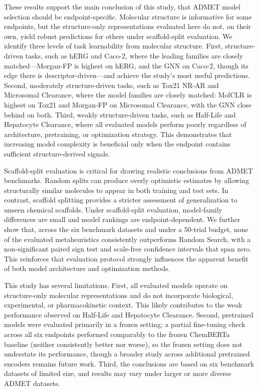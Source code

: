 \documentclass[journal]{IEEEtran}
\begin{document}
These results support the main conclusion of this study, that ADMET model selection should be endpoint-specific. Molecular structure is informative for some endpoints, but the structure-only representations evaluated here do not, on their own, yield robust predictions for others under scaffold-split evaluation. We identify three levels of task learnability from molecular structure. First, structure-driven tasks, such as hERG and Caco-2, where the leading families are closely matched---Morgan-FP is highest on hERG, and the GNN on Caco-2, though its edge there is descriptor-driven---and achieve the study's most useful predictions. Second, moderately structure-driven tasks, such as Tox21 NR-AR and Microsomal Clearance, where the model families are closely matched: MolCLR is highest on Tox21 and Morgan-FP on Microsomal Clearance, with the GNN close behind on both. Third, weakly structure-driven tasks, such as Half-Life and Hepatocyte Clearance, where all evaluated models perform poorly regardless of architecture, pretraining, or optimization strategy. This demonstrates that increasing model complexity is beneficial only when the endpoint contains sufficient structure-derived signals.

Scaffold-split evaluation is critical for drawing realistic conclusions from ADMET benchmarks. Random splits can produce overly optimistic estimates by allowing structurally similar molecules to appear in both training and test sets. In contrast, scaffold splitting provides a stricter assessment of generalization to unseen chemical scaffolds. Under scaffold-split evaluation, model-family differences are small and model rankings are endpoint-dependent. We further show that, across the six benchmark datasets and under a 50-trial budget, none of the evaluated metaheuristics consistently outperforms Random Search, with a non-significant paired sign test and scale-free confidence intervals that span zero. This reinforces that evaluation protocol strongly influences the apparent benefit of both model architecture and optimization methods.

This study has several limitations. First, all evaluated models operate on structure-only molecular representations and do not incorporate biological, experimental, or pharmacokinetic context. This likely contributes to the weak performance observed on Half-Life and Hepatocyte Clearance. Second, pretrained models were evaluated primarily in a frozen setting; a partial fine-tuning check across all six endpoints performed comparably to the frozen ChemBERTa baseline (neither consistently better nor worse), so the frozen setting does not understate its performance, though a broader study across additional pretrained encoders remains future work. Third, the conclusions are based on six benchmark datasets of limited size, and results may vary under larger or more diverse ADMET datasets.
\end{document}
